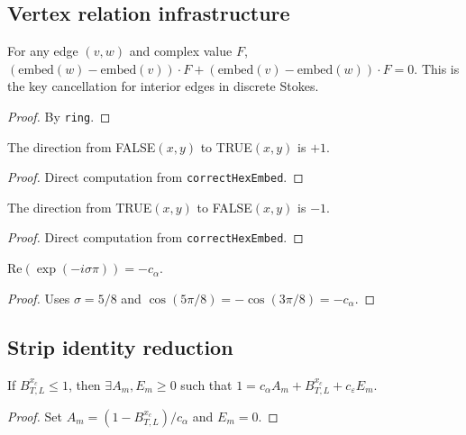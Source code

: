 \begin{lemma}
\begin{enumerate}
\subsection{Vertex relation infrastructure}

\begin{lemma}\label{lem:interior-cancel}
\leanok
  For any edge $(v,w)$ and complex value $F$,
  $(\text{embed}(w) - \text{embed}(v)) \cdot F + (\text{embed}(v) - \text{embed}(w)) \cdot F = 0$.
  This is the key cancellation for interior edges in discrete Stokes.
\end{lemma}
\begin{proof}\leanok
  By \texttt{ring}.
\end{proof}

\begin{lemma}\label{lem:right-dir}
\leanok
  The direction from FALSE$(x,y)$ to TRUE$(x,y)$ is $+1$.
\end{lemma}
\begin{proof}\leanok
  Direct computation from \texttt{correctHexEmbed}.
\end{proof}

\begin{lemma}\label{lem:left-dir}
\leanok
  The direction from TRUE$(x,y)$ to FALSE$(x,y)$ is $-1$.
\end{lemma}
\begin{proof}\leanok
  Direct computation from \texttt{correctHexEmbed}.
\end{proof}

\begin{lemma}\label{lem:left-phase}
\leanok
  $\text{Re}(\exp(-i\sigma\pi)) = -c_\alpha$.
\end{lemma}
\begin{proof}\leanok
  Uses $\sigma = 5/8$ and $\cos(5\pi/8) = -\cos(3\pi/8) = -c_\alpha$.
\end{proof}

\subsection{Strip identity reduction}

\begin{theorem}\label{thm:boundary-strip}
\leanok
  If $B^{x_c}_{T,L} \leq 1$, then $\exists A_m, E_m \geq 0$ such that
  $1 = c_\alpha A_m + B^{x_c}_{T,L} + c_\varepsilon E_m$.
\end{theorem}
\begin{proof}\leanok
  Set $A_m = (1 - B^{x_c}_{T,L})/c_\alpha$ and $E_m = 0$.
\end{proof}


\end{enumerate}
\end{lemma}
